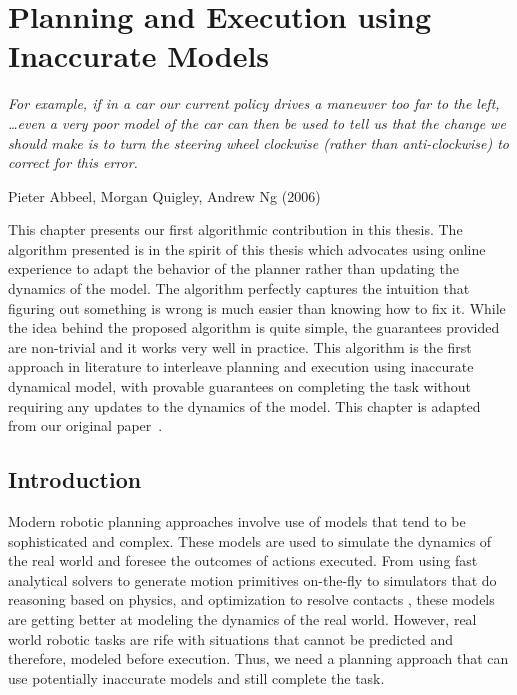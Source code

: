 \chapter{Planning and Execution using Inaccurate Models}
\label{CHA:CMAX}

\epigraph{\textit{For example, if in a car our current policy drives a
    maneuver too far to the left, \ldots even a very poor model of the
    car can then be used to tell us that 
    the change we should make is to turn the steering wheel clockwise
    (rather than anti-clockwise) to correct for this error.}}{Pieter
  Abbeel, Morgan Quigley, Andrew Ng (2006)}


This chapter presents our first algorithmic contribution in this
thesis. The algorithm presented is in the spirit of this thesis which
advocates using online experience to adapt the behavior of the planner
rather than updating the dynamics of the model. The algorithm
perfectly captures the intuition that figuring out something is
wrong is much easier than knowing how to fix it. While the idea behind
the proposed algorithm is quite simple, the guarantees provided are
non-trivial and it works very well in practice. This algorithm is the
first approach in literature to interleave planning and execution using inaccurate
dynamical model,
with provable guarantees on completing the task without requiring any
updates to the dynamics of the model. This chapter is
adapted from our original paper~\cite{cmax}.

\section{Introduction}
\label{sec:introduction}

Modern robotic planning approaches involve use of models that tend to
be sophisticated and complex. These models are used to simulate the
dynamics of the real world and foresee the outcomes of actions
executed. From using fast analytical solvers to generate motion
primitives on-the-fly \cite{DBLP:conf/icra/CohenSCL11} to 
simulators that do reasoning based on physics, and optimization to resolve
contacts \cite{DBLP:conf/iros/TodorovET12}, these models are getting better at
modeling the dynamics of the real world. However, real world robotic
tasks are rife with situations that cannot be predicted and therefore,
modeled before execution. Thus, we need a
planning approach that can use potentially inaccurate models and still
complete the task.

